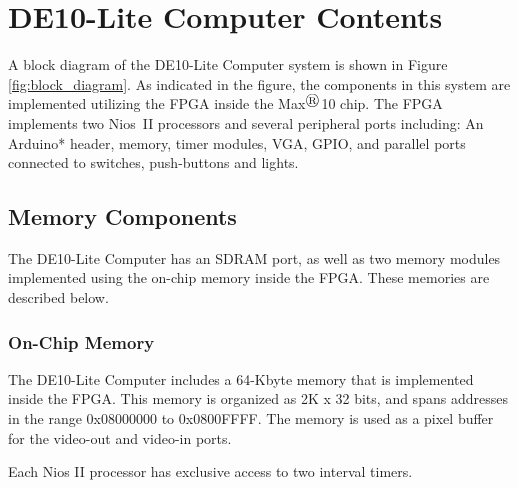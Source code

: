 \section{DE10-Lite Computer Contents}
A block diagram of the DE10-Lite Computer system is shown in 
Figure \ref{fig:block_diagram}.  As indicated in the figure, the components in this system 
are implemented utilizing the FPGA inside the Max$^{\registered}$10 chip. 
The FPGA implements two Nios\textsuperscript{\textregistered}~II processors and several peripheral ports including: An Arduino* header, 
memory, timer modules, VGA, GPIO, and parallel ports connected to switches, push-buttons and lights.






\subsection{Memory Components}

The DE10-Lite Computer has an SDRAM port, as well as two memory modules implemented 
using the on-chip memory inside the FPGA. These memories are described below.



\subsubsection{On-Chip Memory}
The DE10-Lite Computer includes a 64-Kbyte memory that is implemented inside the FPGA.  This 
memory is organized as 2K {\sf x} 32 bits, and spans addresses in the range 
{\sf 0x08000000} to {\sf 0x0800FFFF}. The memory is used as a pixel buffer for the
video-out and video-in ports.
















Each Nios II processor has exclusive access to two interval timers.




